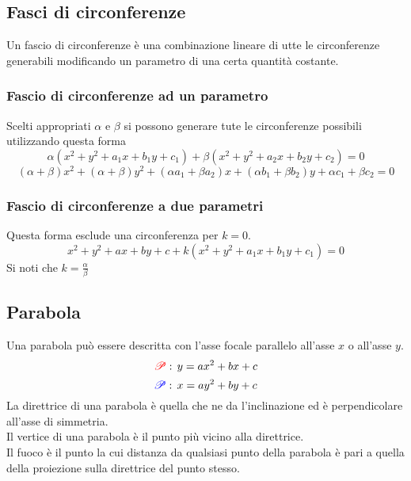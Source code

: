 \subsection{Fasci di circonferenze}\label{subsec:geomanal:fasciocirc}
Un fascio di circonferenze è una combinazione lineare di utte le circonferenze generabili modificando
un parametro di una certa quantità costante.

\subsubsection{Fascio di circonferenze ad un parametro}
Scelti appropriati $\alpha$ e $\beta$ si possono generare tute le circonferenze possibili utilizzando 
questa forma
\begin{equation*}
\alpha(x^2+y^2+a_1x+b_1y+c_1) + \beta(x^2+y^2+a_2x+b_2y+c_2) = 0
\end{equation*}
\begin{equation*}
(\alpha+\beta)x^2+(\alpha+\beta)y^2+(\alpha a_1+\beta a_2)x+(\alpha b_1+\beta b_2)y+
\alpha c_1+\beta c_2 = 0
\end{equation*}

\subsubsection{Fascio di circonferenze a due parametri}
Questa forma esclude una circonferenza per $k=0$.
\begin{equation*}
x^2+y^2+ax+by+c+k(x^2+y^2+a_1x+b_1y+c_1) = 0
\end{equation*}
Si noti che $k=\frac{\alpha}{\beta}$

\subsection{Parabola}\label{subsec:geomanal:parabola}
\begin{center}
\end{center}
Una parabola può essere descritta con l'asse focale parallelo all'asse $x$ o all'asse $y$.
\begin{equation*}
\mathcolor{red}{\mathscr{P}}:\,y=ax^2+bx+c
\end{equation*}
\begin{equation*}
\mathcolor{blue}{\mathscr{P}}:\,x=ay^2+by+c
\end{equation*}
La direttrice di una parabola è quella che ne da l'inclinazione ed è perpendicolare all'asse di
simmetria.\\
Il vertice di una parabola è il punto più vicino alla direttrice.\\
Il fuoco è il punto la cui distanza da qualsiasi punto della parabola è pari a quella della proiezione
sulla direttrice del punto stesso.

